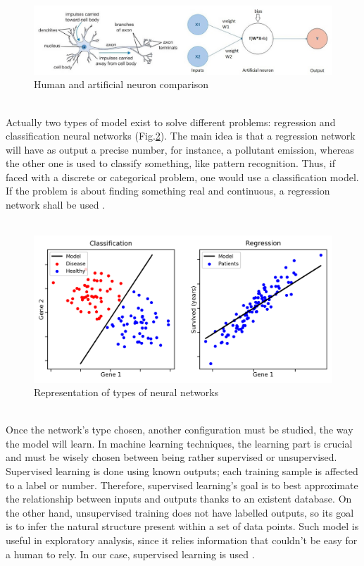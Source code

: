 \documentclass[11pt, a4paper, English]{report}
\begin{document}
\begin{appendix}
\begin{figure}[h!]
    \centering
    \includegraphics[width=\textwidth]{s8_5.jpg}
    \caption{Human and artificial neuron comparison}
    \label{compar}
\end{figure}\\
Actually two types of model exist to solve different problems: regression and classification neural networks (Fig.\ref{models}). The main idea is that a regression network will have as output a precise number, for instance, a pollutant emission, whereas the other one is used to classify something, like pattern recognition. Thus, if faced with a discrete or categorical problem, one would use a classification model. If the problem is about finding something real and continuous, a regression network shall be used \cite{Regression}. \\\\
\begin{figure}[h!]
    \centering
    \includegraphics[scale=0.23]{s9_1.png}
    \caption{Representation of types of neural networks}
    \label{models}
\end{figure}\\
Once the network's type chosen, another configuration must be studied, the way the model will learn. In machine learning techniques, the learning part is crucial and must be wisely chosen between being rather supervised or unsupervised. Supervised learning is done using known outputs; each training sample is affected to a label or number. Therefore, supervised learning's goal is to best approximate the relationship between inputs and outputs thanks to an existent database. On the other hand, unsupervised training does not have labelled outputs, so its goal is to infer the natural structure present within a set of data points\cite{Supervised}.
Such model is useful in exploratory analysis, since it relies information that couldn't be easy for a human to rely. In our case, supervised learning is used .

\end{appendix}
\end{document}
